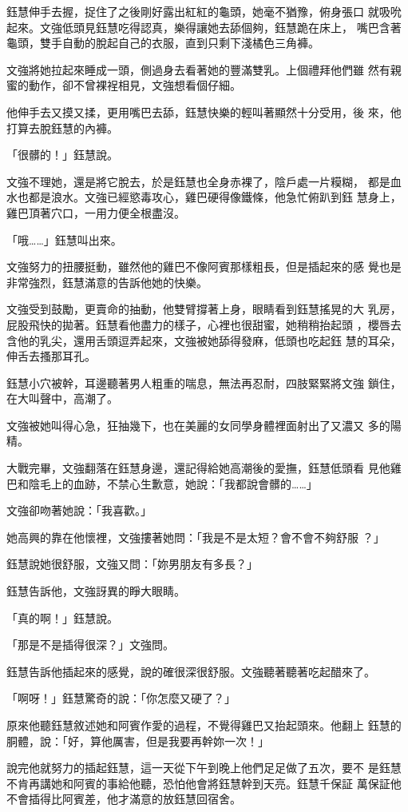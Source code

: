 鈺慧伸手去握，捉住了之後剛好露出紅紅的龜頭，她毫不猶豫，俯身張口
就吸吮起來。文強低頭見鈺慧吃得認真，樂得讓她去舔個夠，鈺慧跪在床上，
嘴巴含著龜頭，雙手自動的脫起自己的衣服，直到只剩下淺橘色三角褲。

文強將她拉起來睡成一頭，側過身去看著她的豐滿雙乳。上個禮拜他們雖
然有親蜜的動作，卻不曾裸裎相見，文強想看個仔細。

他伸手去又摸又揉，更用嘴巴去舔，鈺慧快樂的輕叫著顯然十分受用，後
來，他打算去脫鈺慧的內褲。

「很髒的！」鈺慧說。

文強不理她，還是將它脫去，於是鈺慧也全身赤裸了，陰戶處一片糢糊，
都是血水也都是浪水。文強已經慾毒攻心，雞巴硬得像鐵條，他急忙俯趴到鈺
慧身上，雞巴頂著穴口，一用力便全根盡沒。

「哦……」鈺慧叫出來。

文強努力的扭腰挺動，雖然他的雞巴不像阿賓那樣粗長，但是插起來的感
覺也是非常強烈，鈺慧滿意的告訴他她的快樂。

文強受到鼓勵，更賣命的抽動，他雙臂撐著上身，眼睛看到鈺慧搖晃的大
乳房，屁股飛快的拋著。鈺慧看他盡力的樣子，心裡也很甜蜜，她稍稍抬起頭
，櫻唇去含他的乳尖，還用舌頭逗弄起來，文強被她舔得發麻，低頭也吃起鈺
慧的耳朵，伸舌去搔那耳孔。

鈺慧小穴被幹，耳邊聽著男人粗重的喘息，無法再忍耐，四肢緊緊將文強
鎖住，在大叫聲中，高潮了。

文強被她叫得心急，狂抽幾下，也在美麗的女同學身體裡面射出了又濃又
多的陽精。

大戰完畢，文強翻落在鈺慧身邊，還記得給她高潮後的愛撫，鈺慧低頭看
見他雞巴和陰毛上的血跡，不禁心生歉意，她說：「我都說會髒的……」

文強卻吻著她說：「我喜歡。」

她高興的靠在他懷裡，文強摟著她問：「我是不是太短？會不會不夠舒服
？」

鈺慧說她很舒服，文強又問：「妳男朋友有多長？」

鈺慧告訴他，文強訝異的睜大眼睛。

「真的啊！」鈺慧說。

「那是不是插得很深？」文強問。

鈺慧告訴他插起來的感覺，說的確很深很舒服。文強聽著聽著吃起醋來了。

「啊呀！」鈺慧驚奇的說：「你怎麼又硬了？」

原來他聽鈺慧敘述她和阿賓作愛的過程，不覺得雞巴又抬起頭來。他翻上
鈺慧的胴體，說：「好，算他厲害，但是我要再幹妳一次！」

說完他就努力的插起鈺慧，這一天從下午到晚上他們足足做了五次，要不
是鈺慧不肯再講她和阿賓的事給他聽，恐怕他會將鈺慧幹到天亮。鈺慧千保証
萬保証他不會插得比阿賓差，他才滿意的放鈺慧回宿舍。










